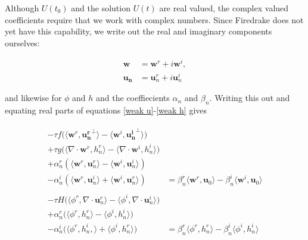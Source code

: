 \documentclass[14pt]{article}
\def\MM#1{\boldsymbol{#1}}
\begin{document}
Although $U(t_0)$ and the solution $U(t)$ are real valued, the complex
valued coefficients require that we work with complex numbers. Since
Firedrake does not yet have this capability, we write out the real and
imaginary components ourselves:

\begin{align}
  \MM{w} &= \MM{w}^r + i\MM{w}^i, \\
  \MM{u_n} &= \MM{u}_n^r + i\MM{u}_n^i
\end{align}

\noindent and likewise for $\phi$ and $h$ and the coeffiecients
$\alpha_n$ and $\beta_n$. Writing this out and equating real parts of
equations \ref{weak u}-\ref{weak h} gives

\begin{align}
  \begin{split}
    -\tau f\big(\langle\MM{w}^r, \MM{u_n^r}^\perp\rangle - \langle\MM{w}^i, \MM{u_n^i}^\perp\rangle\big) \\
  + \tau g\big(\langle\nabla\cdot\MM{w}^r, h_n^r\rangle - \langle\nabla\cdot\MM{w}^i, h_n^i\rangle\big) \\
  + \alpha_n^r(\langle\MM{w}^r, \MM{u}_n^r\rangle - \langle\MM{w}^i, \MM{u}_n^i\rangle) \\
  - \alpha_n^i(\langle\MM{w}^r, \MM{u}_n^i\rangle + \langle\MM{w}^i, \MM{u}_n^r\rangle) &= \beta_n^r\langle\MM{w}^r, \MM{u}_0\rangle - \beta_n^i\langle\MM{w}^i, \MM{u}_0\rangle
  \end{split}\\
  \begin{split}
    -\tau H \big(\langle\phi^r, \nabla\cdot\MM{u}_n^r\rangle - \langle\phi^i, \nabla\cdot\MM{u}_n^i\rangle\big) \\
    +\alpha_n^r\big(\langle\phi^r, h_n^r\rangle - \langle\phi^i, h_n^i\rangle\big) \\
    -\alpha_n^i\big(\langle\phi^r, h_n^i,\rangle + \langle\phi^i, h_n^r\rangle\big) &= \beta_n^r\langle\phi^r, h_n^r\rangle - \beta_n^i\langle\phi^i, h_n^i\rangle
  \end{split}
\end{align}
\end{document}
